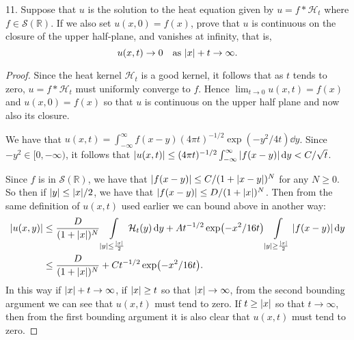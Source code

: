 \documentclass[11pt]{article}
\begin{document}
11. Suppose that $u$ is the solution to the heat equation given by $u = f\ast \mathcal{H}_t$ where $f\in \mathcal{S}(\mathbb{R})$. If we also set $u(x,0) = f(x)$, prove that $u$ is continuous on the closure of the upper half-plane, and vanishes at infinity, that is, \[u(x,t)\to 0 \quad \text{as $\abs{x}+ t \to \infty$.}\]
\begin{proof}
    Since the heat kernel $\mathcal{H}_t$ is a good kernel, it follows that as $t$ tends to zero, $u = f\ast \mathcal{H}_t$ must uniformly converge to $f$. Hence $\lim_{t\to 0}u(x,t) = f(x)$ and $u(x,0) = f(x)$ so that $u$ is continuous on the upper half plane and now also its closure.

    We have that $u(x,t) = \int_{-\infty}^{\infty}f(x-y)(4\pi t)^{-1/2}\exp(-y^2/4t)\dd{y}$. Since $-y^2\in [0,-\infty)$, it follows that $\abs{u(x,t)} \leq (4\pi t)^{-1/2}\int_{-\infty}^{\infty}\abs{f(x-y)}\dd{y} < C/\sqrt{t}$.

    Since $f$ is in $\mathcal{S}(\mathbb{R})$, we have that $\abs{f(x-y)}\leq C/(1+\abs{x-y})^N$ for any $N\geq 0$. So then if $\abs{y}\leq \abs{x}/2$, we have that $\abs{f(x-y)}\leq D/(1+\abs{x})^N$. Then from the same definition of $u(x,t)$ used earlier we can bound above in another way:\begin{align*}
        \abs{u(x,y)}&\leq \frac{D}{(1+\abs{x})^N} \int\limits_{\abs{y}\leq \frac{\abs{x}}{2}} \mathcal{H}_t(y)\dd{y} + At^{-1/2}\exp(-x^2/16t)\int\limits_{\abs{y}\geq \frac{\abs{x}}{2}} \abs{f(x-y)}\dd{y}\\
        &\leq \frac{D}{(1+\abs{x})^N} + Ct^{-1/2}\exp(-x^2/16t).
    \end{align*}
    In this way if $\abs{x}+ t\to \infty$, if $\abs{x} \geq t$ so that $\abs{x}\to \infty$, from the second bounding argument we can see that $u(x,t)$ must tend to zero. If $t \geq \abs{x}$ so that $t\to \infty$, then from the first bounding argument it is also clear that $u(x,t)$ must tend to zero.
\end{proof}
\end{document}
